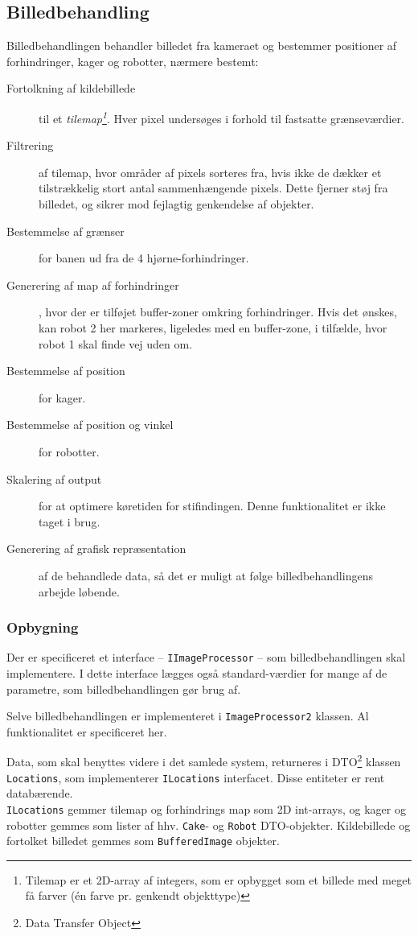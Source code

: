 \subsection{Billedbehandling}
Billedbehandlingen behandler billedet fra kameraet og bestemmer positioner af forhindringer, kager og robotter, nærmere bestemt:
\begin{description}
	\item[Fortolkning af kildebillede] til et \textit{tilemap\footnote{Tilemap er et 2D-array af integers, som er opbygget som et billede med meget få farver (én farve pr. genkendt objekttype)}}. Hver pixel undersøges i forhold til fastsatte grænseværdier.
	\item[Filtrering] af tilemap, hvor områder af pixels sorteres fra, hvis ikke de dækker et tilstrækkelig stort antal sammenhængende pixels. Dette fjerner støj fra billedet, og sikrer mod fejlagtig genkendelse af objekter.
	\item[Bestemmelse af grænser] for banen ud fra de 4 hjørne-forhindringer.
	\item[Generering af map af forhindringer], hvor der er tilføjet buffer-zoner omkring forhindringer. Hvis det ønskes, kan robot 2 her markeres, ligeledes med en buffer-zone, i tilfælde, hvor robot 1 skal finde vej uden om.
	\item[Bestemmelse af position] for kager.
	\item[Bestemmelse af position og vinkel] for robotter.
	\item[Skalering af output] for at optimere køretiden for stifindingen. Denne funktionalitet er ikke taget i brug.
	\item[Generering af grafisk repræsentation] af de behandlede data, så det er muligt at følge billedbehandlingens arbejde løbende.
\end{description}

\subsubsection{Opbygning}
Der er specificeret et interface -- \texttt{IImageProcessor} -- som billedbehandlingen skal implementere. I dette interface lægges også standard-værdier for mange af de parametre, som billedbehandlingen gør brug af.

Selve billedbehandlingen er implementeret i \texttt{ImageProcessor2} klassen.  Al funktionalitet er specificeret her.

Data, som skal benyttes videre i det samlede system, returneres i DTO\footnote{Data Transfer Object} klassen \texttt{Locations}, som implementerer \texttt{ILocations} interfacet. Disse entiteter er rent databærende.\\
\texttt{ILocations} gemmer tilemap og forhindrings map som 2D int-arrays, og kager og robotter gemmes som lister af hhv. \texttt{Cake}- og \texttt{Robot} DTO-objekter. Kildebillede og fortolket billedet gemmes som \texttt{BufferedImage} objekter.

